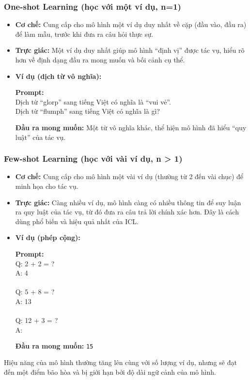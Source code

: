 \subsubsection{One-shot Learning (học với một ví dụ, n=1)}
\begin{itemize}
    \item \textbf{Cơ chế:} Cung cấp cho mô hình một ví dụ duy nhất về cặp (đầu vào, đầu ra) để làm mẫu, trước khi đưa ra câu hỏi thực sự.
    \item \textbf{Trực giác:} Một ví dụ duy nhất giúp mô hình “định vị” được tác vụ, hiểu rõ hơn về định dạng đầu ra mong muốn và bối cảnh cụ thể.
    \item \textbf{Ví dụ (dịch từ vô nghĩa):}
        \begin{promptbox}
        \textbf{Prompt:} \\
        Dịch từ “glorp” sang tiếng Việt có nghĩa là “vui vẻ”. \\
        Dịch từ “flumph” sang tiếng Việt có nghĩa là gì?
        \end{promptbox}
        \textbf{Đầu ra mong muốn:} Một từ vô nghĩa khác, thể hiện mô hình đã hiểu “quy luật” của tác vụ.
\end{itemize}

\subsubsection{Few-shot Learning (học với vài ví dụ, n > 1)}
\begin{itemize}
    \item \textbf{Cơ chế:} Cung cấp cho mô hình một vài ví dụ (thường từ 2 đến vài chục) để minh họa cho tác vụ.
    \item \textbf{Trực giác:} Càng nhiều ví dụ, mô hình càng có nhiều thông tin để suy luận ra quy luật của tác vụ, từ đó đưa ra câu trả lời chính xác hơn. Đây là cách dùng phổ biến và hiệu quả nhất của ICL.
    \item \textbf{Ví dụ (phép cộng):}
        \begin{promptbox}
        \textbf{Prompt:} \\
        Q: 2 + 2 = ? \\
        A: 4 \\
        \\
        Q: 5 + 8 = ? \\
        A: 13 \\
        \\
        Q: 12 + 3 = ? \\
        A: 
        \end{promptbox}
        \textbf{Đầu ra mong muốn:} \texttt{15}
\end{itemize}
Hiệu năng của mô hình thường tăng lên cùng với số lượng ví dụ, nhưng sẽ đạt đến một điểm bão hòa và bị giới hạn bởi độ dài ngữ cảnh của mô hình.

